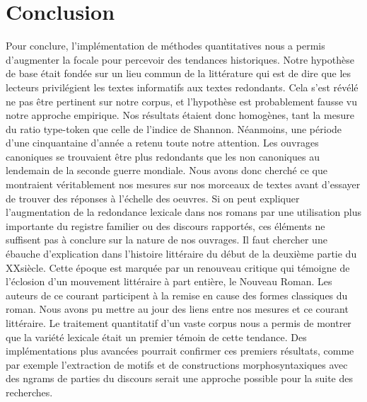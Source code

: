\documentclass[a4paper,twoside,12pt]{book}
\begin{document}
\section*{Conclusion}
Pour conclure, l'implémentation de méthodes quantitatives nous a permis d'augmenter la focale pour percevoir des tendances historiques. Notre hypothèse de base était fondée sur un lieu commun de la littérature qui est de dire que les lecteurs privilégient les textes informatifs aux textes redondants. Cela s'est révélé ne pas être pertinent sur notre corpus, et l'hypothèse est probablement fausse vu notre approche empirique. Nos résultats étaient donc homogènes, tant la mesure du ratio type-token que celle de l'indice de Shannon. Néanmoins, une période d'une cinquantaine d'année a retenu toute notre attention. Les ouvrages canoniques se trouvaient être plus redondants que les non canoniques au lendemain de la seconde guerre mondiale. Nous avons donc cherché ce que montraient véritablement nos mesures sur nos morceaux de textes avant d'essayer de trouver des réponses à l'échelle des oeuvres. Si on peut expliquer l'augmentation de la redondance lexicale dans nos romans par une utilisation plus importante du registre familier ou des discours rapportés, ces éléments ne suffisent pas à conclure sur la nature de nos ouvrages. Il faut chercher une ébauche d'explication dans l'histoire littéraire du début de la deuxième partie du XX\ieme siècle. Cette époque est marquée par un renouveau critique qui témoigne de l'éclosion d'un mouvement littéraire à part entière, le Nouveau Roman. Les auteurs de ce courant participent à la remise en cause des formes classiques du roman. Nous avons pu mettre au jour des liens entre nos mesures et ce courant littéraire. Le traitement quantitatif d'un vaste corpus nous a permis de montrer que la variété lexicale était un premier témoin de cette tendance. Des implémentations plus avancées pourrait confirmer ces premiers résultats, comme par exemple l'extraction de motifs et de constructions morphosyntaxiques avec des ngrams de parties du discours serait une approche possible pour la suite des recherches.


\backmatter
\listoffigures

\newpage
\nocite{*}
\printbibliography
\end{document}
